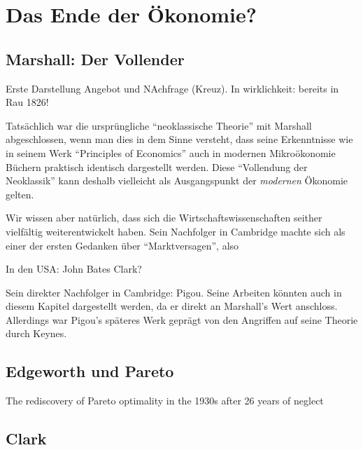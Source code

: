 %
%
%

\chapter{Das Ende der Ökonomie?}
\label{Neoklassik}

\section{Marshall: Der Vollender}

Erste Darstellung Angebot und NAchfrage (Kreuz). In wirklichkeit: bereits in Rau 1826! \textcite[S. 159]{Blaug2001}


Tatsächlich war die ursprüngliche "`neoklassische Theorie"' mit Marshall abgeschlossen, wenn man dies in dem Sinne versteht, dass seine Erkenntnisse wie in seinem Werk "`Principles of Economics"' auch in modernen Mikroökonomie Büchern praktisch identisch dargestellt werden. Diese "`Vollendung der Neoklassik"' kann deshalb vielleicht als Ausgangspunkt der \textit{modernen} Ökonomie gelten. 


Wir wissen aber natürlich, dass sich die Wirtschaftswissenschaften seither vielfältig weiterentwickelt haben.  Sein Nachfolger in Cambridge machte sich als einer der ersten Gedanken über "`Marktversagen"', also 



In den USA: John Bates Clark?


Sein direkter Nachfolger in Cambridge: Pigou. Seine Arbeiten könnten auch in diesem Kapitel dargestellt werden, da er direkt an Marshall's Wert anschloss. Allerdings war Pigou's späteres Werk geprägt von den Angriffen auf seine Theorie durch Keynes. 







\section{Edgeworth und Pareto}
The rediscovery of Pareto optimality in the 1930s after
26 years of neglect \textcite[S. 148]{Blaug2001}




\section{Clark}





